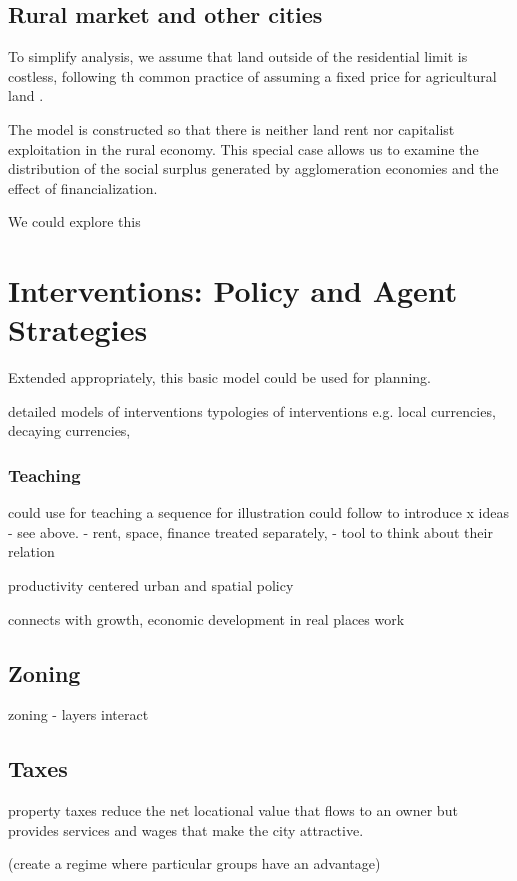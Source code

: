 \subsection{Rural market and other cities}

 To simplify analysis, we assume that land outside of the residential limit is costless, following th common practice of assuming a fixed price for agricultural land \cite{GET_fixed-price-ag-land}. 

The model is constructed so that there is neither land rent nor capitalist exploitation in the rural economy. 
This special case allows us to examine the distribution of the social surplus generated by agglomeration economies and the effect of financialization.

We could explore this

\section{Interventions: Policy and Agent Strategies}
Extended appropriately, this basic model could be used for planning.

detailed models of interventions typologies of interventions e.g. local currencies, decaying currencies, 

\subsubsection{Teaching}
could use for teaching a sequence for illustration could follow to introduce x ideas - see above. - rent, space, finance treated separately, - tool to think about their relation

productivity centered urban and spatial policy

connects with growth, economic development in real places work

\subsection{Zoning}
zoning - layers interact

\subsection{Taxes}
property taxes reduce the net locational value that flows to an owner but provides services and wages that make the city attractive. 

(create a regime where particular groups have an advantage)

